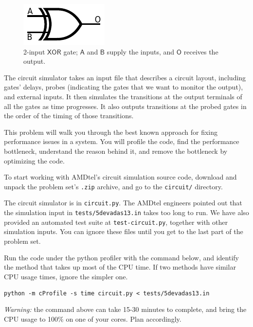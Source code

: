 \documentclass[12pt,twoside]{article}
\begin{document}
\begin{problems}
	\begin{figure}[htbp]
		\centering
		\includegraphics{figures/xor-ansi}
		\caption{2-input $\mathsf{XOR}$ gate; $\mathsf{A}$ and $\mathsf{B}$ supply the
			inputs, and $\mathsf{O}$ receives the output.}
		\label{fig:xor}
	\end{figure}

	The circuit simulator takes an input file that describes a circuit layout,
	including gates' delays, probes (indicating the gates that we want to
	monitor the output), and external inputs. It then simulates the transitions at
	the output terminals of all the gates as time progresses. It also outputs
	transitions at the probed gates in the order of the timing of those
	transitions.

	This problem will walk you through the best known approach for fixing
	performance issues in a system. You will profile the code, find the performance
	bottleneck, understand the reason behind it, and remove the bottleneck by
	optimizing the code.

	To start working with AMDtel's circuit simulation source code, download and
	unpack the problem set's \texttt{.zip} archive, and go to the \texttt{circuit/}
	directory.

	The circuit simulator is in \texttt{circuit.py}. The AMDtel engineers pointed
	out that the simulation input in \texttt{tests/5devadas13.in} takes too long
	to run. We have also provided an automated test suite at
	\texttt{test-circuit.py}, together with other simulation inputs. You can ignore
	these files until you get to the last part of the problem set.

	\begin{problemparts}

		\problempart {} Run the code under the python profiler with the command
		below, and identify the method that takes up most of the CPU time. If two
		methods have similar CPU usage times, ignore the simpler one.

		\texttt{python -m cProfile -s time circuit.py < tests/5devadas13.in}

		\textit{Warning:} the command above can take 15-30 minutes to complete, and
		bring the CPU usage to 100\% on one of your cores. Plan accordingly.


\end{problemparts}
\end{problems}
\end{document}
